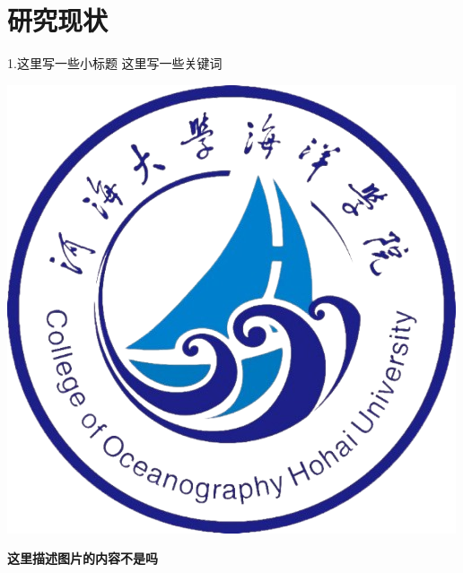 \documentclass[10pt]{beamer}
\begin{document}
\section{研究现状}

\begin{frame}{{1.这里写一些小标题 } \hfill 这里写一些关键词}
    \begin{minipage}[t]{0.48\linewidth}
        \centering
        \includegraphics[width=\linewidth]{fig/college.png} %
        \vspace{0.2cm}

        \scriptsize
        \textbf{这里描述图片的内容不是吗} \\
         \\
        

\end{minipage}
\end{frame}
\end{document}
